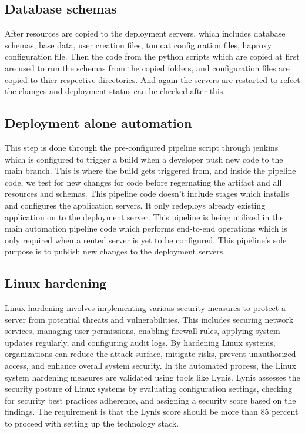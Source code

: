\documentclass[12pt,a4paper,oneside]{report}
\begin{document}
\subsection{Database schemas}
\par\hspace{1cm} After resources are copied to the deployment servers, which includes database schemas, base data, user creation files, tomcat configuration files, haproxy configuration file. Then the code from the python scripts which are copied at first are used to run the schemas from the copied folders, and configuration files are copied to thier respective directories.
And again the servers are restarted to refect the changes and deployment status can be checked after this.

\subsection{Deployment alone automation}
This step is done through the pre-configured pipeline script through jenkins which is configured to trigger a build when a developer push new code to the main branch. This is where the build gets triggered from, and inside the pipeline code, we test for new changes for code before regernating the artifact and all resources and schemas.
This pipeline code doesn't include stages which installs and configures the application servers. It only redeploys already existing application on to the deployment server. This pipeline is being utilized in the main automation  pipeline code which performs end-to-end operations which is only required when a rented server is yet to be configured. This pipeline's sole purpose is to publish new changes to the deployment servers.

\subsection{Linux hardening}
\par Linux hardening involves implementing various security measures to protect a server from potential threats and vulnerabilities. This includes securing network services, managing user permissions, enabling firewall rules, applying system updates regularly, and configuring audit logs. By hardening Linux systems, organizations can reduce the attack surface, mitigate risks, prevent unauthorized access, and enhance overall system security. In the automated process, the Linux system hardening measures are validated using tools like Lynis. Lynis assesses the security posture of Linux systems by evaluating configuration settings, checking for security best practices adherence, and assigning a security score based on the findings. The requirement is that the Lynis score should be more than 85 percent to proceed with setting up the technology stack.
\end{document}
